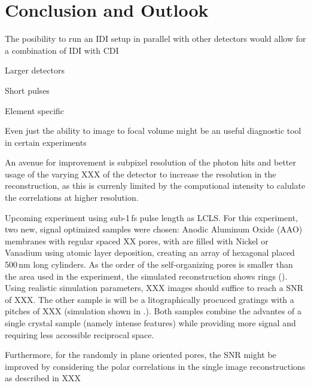 \chapter{Conclusion and Outlook}

The posibility to run an IDI setup in parallel with other detectors would allow for a combination of IDI with CDI

Larger detectors

Short pulses

Element specific 


Even just the ability to image to focal volume might be an useful diagnostic tool in certain experiments


An avenue for improvement is subpixel resolution of the photon hits and better usage of the varying XXX of the detector to increase the resolution in the reconstruction, as this is currenly limited by the computional intensity to calulate the correlations at higher resolution.





Upcoming experiment using sub-1\,fs pulse length as LCLS. 
For this experiment, two new, signal optimized samples were chosen: Anodic Aluminum Oxide (AAO) membranes with regular spaced XX pores, with are filled with Nickel or Vanadium using atomic layer deposition, creating an array of hexagonal placed  500\,nm long cylinders. As the order of the self-organizing pores is smaller than the area used in the experiment, the simulated reconstruction shows rings (). Using realistic simulation parameters, XXX images should suffice to reach a SNR of XXX.
The other sample is will be a litographically procuced gratings with a pitches of XXX (simulation shown in .). Both samples combine the advantes of a single crystal sample (namely intense features) while providing more signal and requiring less accessible reciprocal space. 


Furthermore, for the randomly in plane oriented pores, the SNR might be improved by considering the polar correlations in the single image reconstructions as described in XXX